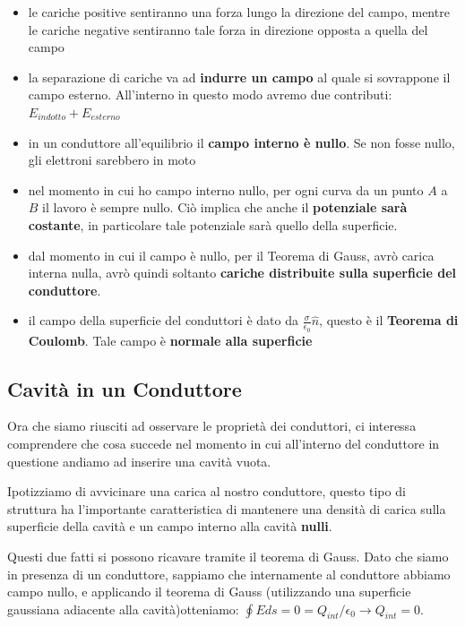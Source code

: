 \begin{itemize}
		\item le cariche positive sentiranno una forza lungo la direzione del campo, mentre le cariche negative sentiranno tale forza in direzione opposta a quella del campo
		
		\item la separazione di cariche va ad \textbf{indurre un campo} al quale si sovrappone il campo esterno. All'interno in questo modo avremo due contributi: $E_{indotto} + E_{esterno}$
		
		\item in un conduttore all'equilibrio il \textbf{campo interno è nullo}. Se non fosse nullo, gli elettroni sarebbero in moto
		
		\item nel momento in cui ho campo interno nullo, per ogni curva da un punto $A$ a $B$ il lavoro è sempre nullo. Ciò implica che anche il \textbf{potenziale sarà costante}, in particolare tale potenziale sarà quello della superficie.
		
		\item dal momento in cui il campo è nullo, per il Teorema di Gauss, avrò carica interna nulla, avrò quindi soltanto \textbf{cariche distribuite sulla superficie del conduttore}. 
		
		\item il campo della superficie del conduttori è dato da $\frac{\sigma}{\epsilon_0} \hat{n}$, questo è il \textbf{Teorema di Coulomb}. Tale campo è \textbf{normale alla superficie}
\end{itemize}

\subsection{Cavità in un Conduttore}
Ora che siamo riusciti ad osservare le proprietà dei conduttori, ci interessa comprendere che cosa succede nel momento in cui all'interno del conduttore in questione andiamo ad inserire una cavità vuota. 

Ipotizziamo di avvicinare una carica al nostro conduttore, questo tipo di struttura ha l'importante caratteristica di mantenere una densità di carica sulla superficie della cavità e un campo interno alla cavità \textbf{nulli}. 

Questi due fatti si possono ricavare tramite il teorema di Gauss. Dato che siamo in presenza di un conduttore, sappiamo che internamente al conduttore abbiamo campo nullo, e applicando il teorema di Gauss (utilizzando una superficie gaussiana adiacente alla cavità)otteniamo: $\oint Eds = 0 = Q_{int} / \epsilon_0 \rightarrow Q_{int} = 0$. 

